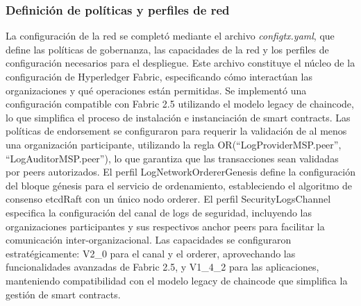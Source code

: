 \subsubsection{Definición de políticas y perfiles de red}
La configuración de la red se completó mediante el archivo \textit{configtx.yaml}, que define las políticas de gobernanza, las capacidades de la red y los perfiles de configuración necesarios para el despliegue. Este archivo constituye el núcleo de la configuración de Hyperledger Fabric, especificando cómo interactúan las organizaciones y qué operaciones están permitidas.
Se implementó una configuración compatible con Fabric 2.5 utilizando el modelo legacy de chaincode, lo que simplifica el proceso de instalación e instanciación de smart contracts. Las políticas de endorsement se configuraron para requerir la validación de al menos una organización participante, utilizando la regla OR(“LogProviderMSP.peer”, “LogAuditorMSP.peer”), lo que garantiza que las transacciones sean validadas por peers autorizados.
El perfil LogNetworkOrdererGenesis define la configuración del bloque génesis para el servicio de ordenamiento, estableciendo el algoritmo de consenso etcdRaft con un único nodo orderer. El perfil SecurityLogsChannel especifica la configuración del canal de logs de seguridad, incluyendo las organizaciones participantes y sus respectivos anchor peers para facilitar la comunicación inter-organizacional.
Las capacidades se configuraron estratégicamente: V2\_0 para el canal y el orderer, aprovechando las funcionalidades avanzadas de Fabric 2.5, y V1\_4\_2 para las aplicaciones, manteniendo compatibilidad con el modelo legacy de chaincode que simplifica la gestión de smart contracts.

